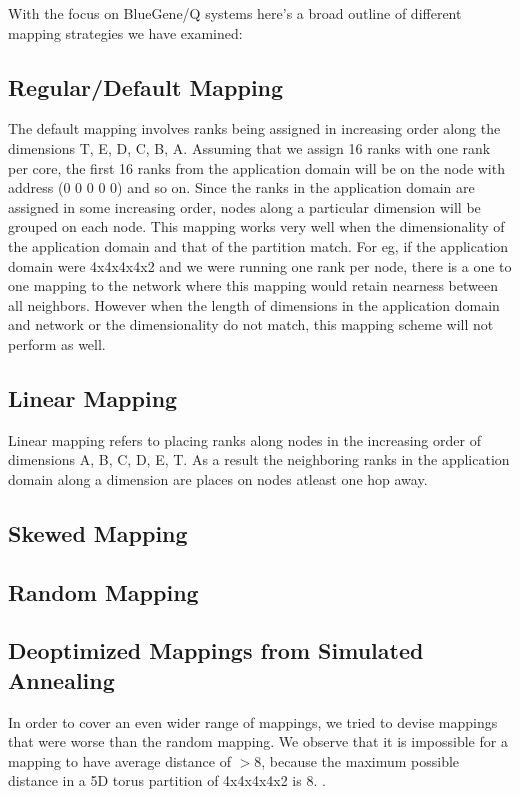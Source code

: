 \documentclass{acm_proc_article-sp}
\begin{document}
With the focus on BlueGene/Q systems here's a broad outline of different mapping strategies we have examined:

\subsection{Regular/Default Mapping}
The default mapping involves ranks being assigned in increasing order along the dimensions T, E, D, C, B, A.
Assuming that we assign 16 ranks with one rank per core, the first 16 ranks from the application domain will
be on the node with address (0 0 0 0 0) and so on. Since the ranks in the application domain are assigned in
some increasing order, nodes along a particular dimension will be grouped on each node. This mapping works
very well when the dimensionality of the application domain and that of the partition match. For eg, if the
application domain were 4x4x4x4x2 and we were running one rank per node, there is a one to one mapping to the
network where this mapping would retain nearness between all neighbors. However when the length of dimensions
in the application domain and network or the dimensionality do not match, this mapping scheme will not perform as well.

\subsection{Linear Mapping}
Linear mapping refers to placing ranks along nodes in the increasing order of dimensions A, B, C, D, E, T.
As a result the neighboring ranks in the application domain along a dimension are places on nodes atleast
one hop away.

\subsection{Skewed Mapping}

\subsection{Random Mapping}
\subsection{Deoptimized Mappings from Simulated Annealing}
In order to cover an even wider range of mappings, we tried to
devise mappings that were worse than the random mapping.
We observe that it is impossible for a mapping to have
average distance of $>8$, because the maximum possible distance
in a 5D torus partition of 4x4x4x4x2 is 8.  .
\end{document}
